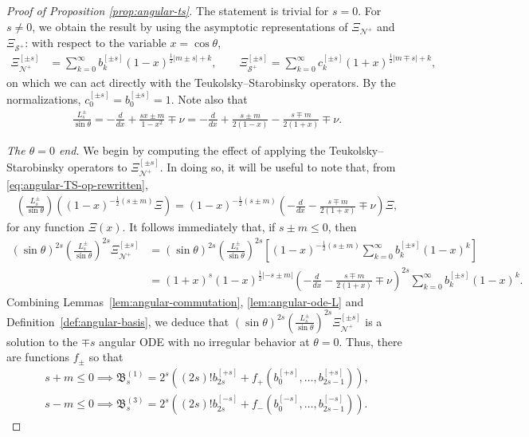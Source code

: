 \documentclass[11pt]{article}
\newcommand{\cN}{\mathcal N}
\newcommand{\cS}{\mathcal S}
\numberwithin{equation}{section}
\begin{document}
\begin{proof}[Proof of Proposition \ref{prop:angular-ts}]
The statement is trivial for $s=0$. For $s\neq 0$, we obtain the result by using the asymptotic representations of $\Xi_{\cN^+}$ and $\Xi_{\cS^+}$: with respect to the variable $x=\cos\theta$,
\begin{align*}
\Xi^{[\pm s]}_{\cN^+}&=\sum_{k=0}^\infty b_k^{[\pm s]}(1-x)^{\frac12|m\pm s|+k},\qquad 
\Xi^{[\pm s]}_{\cS^+}=\sum_{k=0}^\infty c_k^{[\pm s]}(1+x)^{\frac12|m\mp s|+k},
\end{align*}
on which we can act directly with the Teukolsky--Starobinsky operators. By the normalizations, $c_0^{[\pm s]}=b_0^{[\pm s]}=1$. Note also that 
\begin{align}
\frac{L^{\pm}_s}{\sin\theta}=-\frac{d}{dx}+\frac{sx\pm m}{1-x^2}\mp \nu= -\frac{d}{dx}+\frac{s\pm m}{2(1-x)}-\frac{s\mp m}{2(1+x)}\mp \nu. \label{eq:angular-TS-op-rewritten}
\end{align}

\medskip
\noindent \textit{The $\theta=0$ end.}
We begin by computing the effect of applying the Teukolsky--Starobinsky operators to $\Xi^{[\pm s]}_{\cN^+}$. In doing so, it will be useful to note that, from \eqref{eq:angular-TS-op-rewritten},
\begin{align*}
\left(\frac{L^{\pm}_s}{\sin\theta}\right)\left((1-x)^{-\frac{1}{2}(s\pm m)}\Xi\right) = (1-x)^{-\frac{1}{2}(s\pm m)}\left(-\frac{d}{dx}-\frac{s\mp m}{2(1+x)}\mp \nu\right)\Xi,
\end{align*}
for any function $\Xi(x)$. It follows immediately that, if $s\pm m\leq 0$, then
\begin{align*}
(\sin\theta)^{2s}\left(\frac{L^{\pm}_s}{\sin\theta}\right)^{2s} \Xi^{[\pm s]}_{\cN^+} 
&=(\sin\theta)^{2s}\left(\frac{L^{\pm}_s}{\sin\theta}\right)^{2s} \left[(1-x)^{-\frac12(s\pm m)}\sum_{k=0}^\infty b_k^{[\pm s]}(1-x)^{k}\right]\\
&=
(1+x)^{s}(1-x)^{\frac12|-s\pm m|}\left(-\frac{d}{dx}-\frac{s\mp m}{2(1+x)}\mp \nu\right)^{2s} \sum_{k=0}^\infty b_k^{[\pm s]}(1-x)^{k}.
\end{align*} 
Combining Lemmas~\ref{lem:angular-commutation}, \ref{lem:angular-ode-L} and Definition~\ref{def:angular-basis}, we deduce that $(\sin\theta)^{2s}\left(\frac{L^{\pm}_s}{\sin\theta}\right)^{2s} \Xi^{[\pm s]}_{\cN^+} $ is a solution to the $\mp s$ angular ODE with no irregular behavior at $\theta= 0$. Thus, there are functions $f_\pm$ so that
\begin{gather*}
s+ m \leq 0\implies \mathfrak B_s^{(1)}= 2^{s}\left((2s)!b_{2s}^{[+s]}+f_+(b_0^{[+s]}, \dots, b_{2s-1}^{[+s]})\right), \\ s- m \leq 0\implies \mathfrak B_s^{(3)}=2^{s}\left((2s)!b_{2s}^{[-s]}+f_-(b_0^{[-s]}, \dots, b_{2s-1}^{[-s]})\right).
\end{gather*}


\end{proof}
\end{document}
